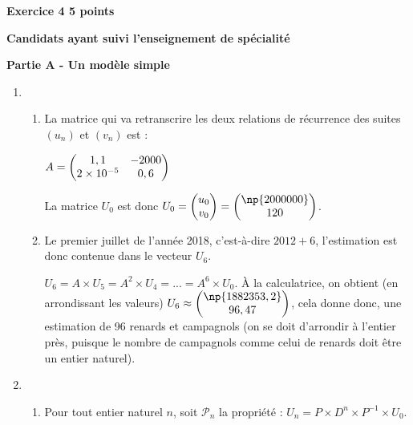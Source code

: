 \documentclass[10pt]{article}
\begin{document}
	\textbf{Exercice 4 \hfill  5 points}
	
	\textbf{Candidats ayant suivi l'enseignement de spécialité}
	
	\medskip
	
	\textbf{Partie A - Un modèle simple}
	
	\medskip
	
	\begin{enumerate}
		\item \begin{enumerate}
			\item La matrice qui va retranscrire les deux relations de récurrence des suites $(u_n)$ et $(v_n)$ est : 
		
			$A = \left( \begin{array}{@{}cc@{}} 1,1&-2000\\2\times 10^{-5}&0,6 \end{array} \right)$ 
			
			La matrice $U_0$ est donc $U_0 = \left(\begin{array}{@{}c@{}} u_0\\v_0 \end{array}\right) =\left(\begin{array}{@{}c@{}} \np{2000000} \\120
			\end{array}\right)$.
			
			\item Le premier juillet de l'année 2018, c'est-à-dire $2012 + 6$, l'estimation est donc contenue dans le vecteur $U_6$.
			
			$U_6 = A \times U_5 = A^2 \times U_4 = ... = A^6 \times U_0$. À la calculatrice, on obtient (en arrondissant les valeurs) $U_6 \approx \left(\begin{array}{@{}c@{}} \np{1882353,2}\\  96,47 \end{array}\right) $, cela donne donc, une estimation de 96 renards et  campagnols (on se doit d'arrondir à l'entier près, puisque le nombre de campagnols comme celui de renards doit être un entier naturel).
		\end{enumerate}
	
		\item \begin{enumerate}
			\item Pour tout entier naturel $n$, soit $\mathcal{P}_n$ la propriété : $U_n = P \times D^n \times P^{-1} \times U_0$.
			
\medskip
			

\end{enumerate}
\end{enumerate}
\end{document}
